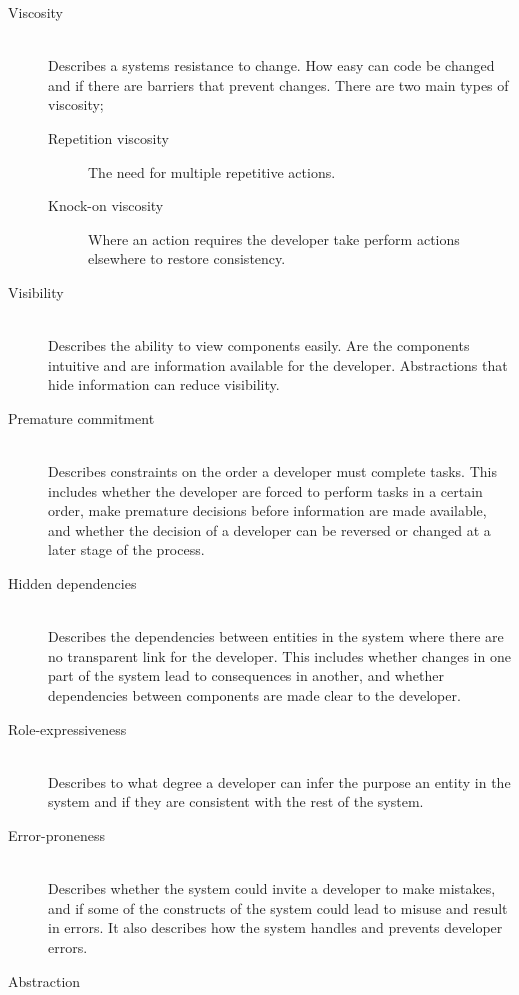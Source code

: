 \begin{description}
    \item[Viscosity]\hfill\\
    Describes a systems resistance to change. How easy can code be changed and if there are barriers that prevent changes. There are two main types of viscosity;
    \begin{description}
        \item[Repetition viscosity] The need for multiple repetitive actions.
        \item[Knock-on viscosity] Where an action requires the developer take perform actions elsewhere to restore consistency. 
    \end{description}
    \item[Visibility]\hfill\\
    Describes the ability to view components easily. Are the components intuitive and are information available for the developer. Abstractions that hide information can reduce visibility.
    \item[Premature commitment]\hfill\\
    Describes constraints on the order a developer must complete tasks. This includes whether the developer are forced to perform tasks in a certain order, make premature decisions before information are made available, and whether the decision of a developer can be reversed or changed at a later stage of the process.
    \item[Hidden dependencies]\hfill\\ %
    Describes the dependencies between entities in the system where there are no transparent link for the developer. This includes whether changes in one part of the system lead to consequences in another, and whether dependencies between components are made clear to the developer.
    \item[Role-expressiveness]\hfill\\
    Describes to what degree a developer can infer the purpose an entity in the system and if they are consistent with the rest of the system. 
    \item[Error-proneness]\hfill\\
    Describes whether the system could invite a developer to make mistakes, and if some of the constructs of the system could lead to misuse and result in errors. It also describes how the system handles and prevents developer errors.
    \item[Abstraction]\hfill\\

\end{description}
